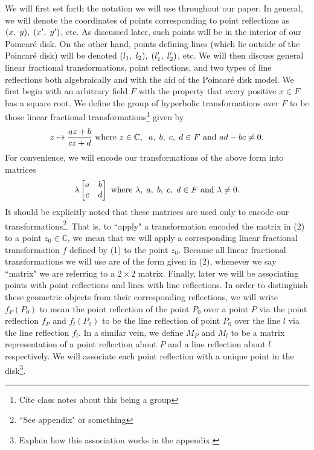 \documentclass[12pt]{article}
\newcommand{\C}{\mathbb{C}}
\newcommand{\poincare}{Poincar\'{e} }
\newcommand{\ttc}{, \hspace{1mm}}
\newcommand{\lftmat}[4]{\begin{bmatrix} {#1} & {#2} \\ {#3} & {#4} \end{bmatrix}}
\newcommand{\stanlftmat}{\lftmat{a}{b}{c}{d}}
\begin{document}
We will first set forth the notation we will use throughout our paper. In general, we will denote the coordinates of points corresponding to point reflections as $(x \ttc y) \ttc (x' \ttc y')$, etc. As discussed later, such points will be in the interior of our \poincare disk. On the other hand, points defining lines (which lie outside of the \poincare disk) will be denoted $(l_1 \ttc l_2) \ttc (l_1' \ttc l_2')$, etc. We will then discuss general linear fractional transformations, point reflections, and two types of line reflections both algebraically and with the aid of the \poincare disk model. We first begin with an arbitrary field $F$ with the property that every positive $x \in F$ has a square root. We define the group of hyperbolic transformations over $F$ to be those linear fractional transformations\footnote{Cite class notes about this being a group} given by
\begin{equation} 
	z \mapsto \frac{az+b}{cz+d} \text{ where } z \in \C, \hspace{2mm} a \ttc b \ttc c \ttc d \in F \text{ and } ad-bc \neq 0. 
\end{equation}
For convenience, we will encode our transformations of the above form into matrices
\begin{equation}
	\lambda \stanlftmat \text{ where } \lambda \ttc a \ttc b \ttc c \ttc d \in F \text{ and } \lambda \neq 0. 
\end{equation}
It should be explicitly noted that these matrices are used only to encode our transformations\footnote{``See appendix" or something}. That is, to ``apply" a transformation encoded the matrix in (2) to a point $z_0 \in \C$, we mean that we will apply a corresponding linear fractional transformation $f$ defined by (1) to the point $z_0$. Because all linear fractional transformations we will use are of the form given in (2), whenever we say ``matrix" we are referring to a $2 \times 2$ matrix. Finally, later we will be associating points with point reflections and lines with line reflections. In order to distinguish these geometric objects from their corresponding reflections, we will write $f_P(P_0)$ to mean the point reflection of the point $P_0$ over a point $P$ via the point reflection $f_P$ and $f_l(P_0)$ to be the line reflection of point $P_0$ over the line $l$ via the line reflection $f_l$. In a similar vein, we define $M_P$ and $M_l$ to be a matrix representation of a point reflection about $P$ and a line reflection about $l$ respectively. We will associate each point reflection with a unique point in the disk\footnote{Explain how this association works in the appendix.}. 
\end{document}
